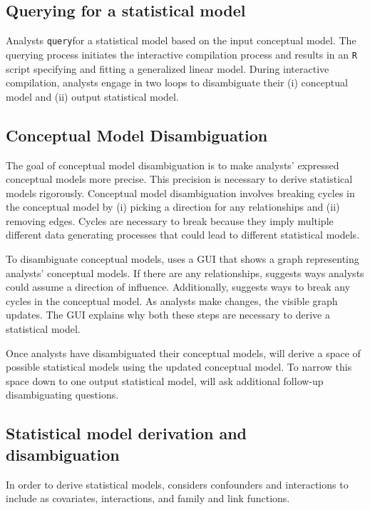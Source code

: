 \def\query{\texttt{query}\xspace}
\subsection{Querying for a statistical model}
Analysts \query \rTisane for a statistical model based on the input conceptual
model. The querying process initiates the interactive compilation process and
results in an \texttt{R} script specifying and fitting a generalized linear
model. During interactive compilation, analysts engage in two loops to
disambiguate their (i) conceptual model and (ii) output statistical model. 

\subsection{Conceptual Model Disambiguation} \label{subsec:conceptualModelDisambig}
The goal of conceptual model disambiguation is to make analysts' expressed
conceptual models more precise. This precision is necessary to derive
statistical models rigorously. Conceptual model disambiguation involves breaking
cycles in the conceptual model by (i) picking a direction for any \relates
relationships and (ii) removing edges. Cycles are necessary to break because
they imply multiple different data generating processes that could lead to
different statistical models. 

To disambiguate conceptual models, \rTisane uses a GUI that shows a graph
representing analysts' conceptual models. If there are any \relates
relationships, \rTisane suggests ways analysts could assume a direction of
influence. Additionally, \rTisane suggests ways to break any cycles in the
conceptual model. As analysts make changes, the visible graph updates. The GUI
explains why both these steps are necessary to derive a statistical model. 

Once analysts have disambiguated their conceptual models, \rTisane will derive a
space of possible statistical models using the updated conceptual model. To
narrow this space down to one output statistical model, \rTisane will ask
additional follow-up disambiguating questions. 

\begin{comment}
This problem is actually challenging because detecting all cycles in a graph is
an NP-hard problem. We adapt a version of Johnson's(?) algorithm.
\end{comment}

\subsection{Statistical model derivation and disambiguation}
In order to derive statistical models, \rTisane considers confounders and
interactions to include as covariates, interactions, and family and link
functions.


